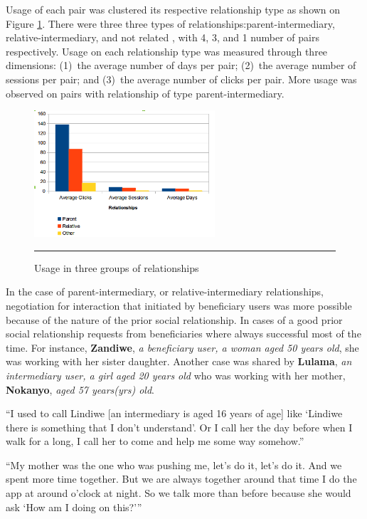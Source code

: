 Usage of each pair  was clustered its respective relationship type as shown on Figure \ref{figure:relation}. There were three three types of relationships:parent-intermediary, relative-intermediary, and not related , with 4, 3, and 1 number of pairs respectively. Usage on each relationship type was measured through three dimensions: (1)~the average number of days per pair; (2)~the average number of sessions per pair; and (3)~the average number of clicks per pair. More usage was observed on pairs with relationship of type parent-intermediary. 
\begin{figure}[htbp]
  \centering
    \includegraphics[width=0.6\textwidth]{Figures/relationships.png}
    \rule{35em}{0.5pt}
  \caption{Usage in three groups of relationships\citep{katule2016leveraging}}
  \label{figure:relation}
\end{figure}
In the case of parent-intermediary, or relative-intermediary relationships, negotiation for interaction that initiated by beneficiary users was more possible because of the nature of the prior social relationship. In cases of a good prior social relationship requests from beneficiaries where always successful most of the time. For instance, \textbf{Zandiwe}, \emph{a beneficiary user, a woman aged 50 years old}, she was working with her sister daughter. Another case was shared by  \textbf{Lulama}, \emph{an intermediary user, a girl aged 20 years old} who was working with her mother, \textbf{Nokanyo}, \emph{aged 57 years(yrs) old}. 

 {``I used to call Lindiwe [an intermediary is aged 16 years of age] like `Lindiwe there is something that I don't understand'. Or I call her the day before when I walk for a long, I call her to come and help me some way somehow.''}

 {``My mother was the one who was pushing me, let’s do it, let’s do it. And we spent more time together. But we are always together around that time I do the app at around o'clock at night. So we talk more than before because she would ask `How am I doing on this?'''}

